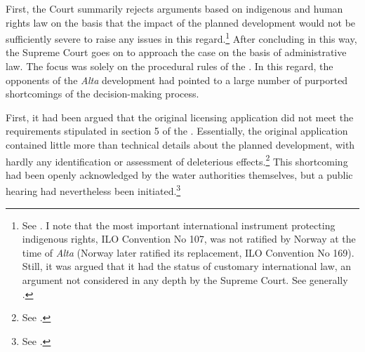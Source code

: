 
First, the Court summarily rejects arguments based on indigenous and human rights law on the basis that the impact of the planned development would not be sufficiently severe to raise any issues in this regard.\footnote{See \cite[351-352]{eckhoff82}. I note that the most important international instrument protecting indigenous rights, ILO Convention No 107, was not ratified by Norway at the time of {\it Alta} (Norway later ratified its replacement, ILO Convention No 169). Still, it was argued that it had the status of customary international law, an argument not considered in any depth by the Supreme Court. See generally \cite{eide80}.} After concluding in this way, the Supreme Court goes on to approach the case on the basis of administrative law. The focus was solely on the procedural rules of the \cite{wra17}. In this regard, the opponents of the {\it Alta} development had pointed to a large number of purported shortcomings of the decision-making process. 

First, it had been argued that the original licensing application did not meet the requirements stipulated in section 5 of the \cite{wra17}. Essentially, the original application contained little more than technical details about the planned development, with hardly any identification or assessment of deleterious effects.\footnote{See \cite[264-265]{alta82}.} This shortcoming had been openly acknowledged by the water authorities themselves, but a public hearing had nevertheless been initiated.\footnote{See \cite[265]{alta82}.}

